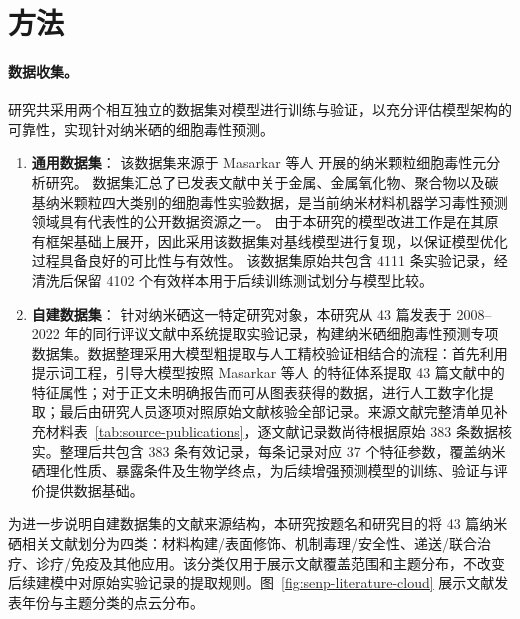\section{方法}

\paragraph{数据收集。}
研究共采用两个相互独立的数据集对模型进行训练与验证，以充分评估模型架构的可靠性，实现针对纳米硒的细胞毒性预测。

\begin{enumerate}
  \item \textbf{通用数据集}：
该数据集来源于 Masarkar 等人 \cite{masarkar2024} 开展的纳米颗粒细胞毒性元分析研究。
数据集汇总了已发表文献中关于金属、金属氧化物、聚合物以及碳基纳米颗粒四大类别的细胞毒性实验数据，是当前纳米材料机器学习毒性预测领域具有代表性的公开数据资源之一。
由于本研究的模型改进工作是在其原有框架基础上展开，因此采用该数据集对基线模型进行复现，以保证模型优化过程具备良好的可比性与有效性。
该数据集原始共包含 4111 条实验记录，经清洗后保留 4102 个有效样本用于后续训练测试划分与模型比较。

  \item \textbf{自建数据集}：
针对纳米硒这一特定研究对象，本研究从 43 篇发表于 2008--2022 年的同行评议文献中系统提取实验记录，构建纳米硒细胞毒性预测专项数据集。数据整理采用大模型粗提取与人工精校验证相结合的流程：首先利用提示词工程，引导大模型按照 Masarkar 等人\cite{masarkar2024} 的特征体系提取 43 篇文献中的特征属性；对于正文未明确报告而可从图表获得的数据，进行人工数字化提取；最后由研究人员逐项对照原始文献核验全部记录。来源文献完整清单见补充材料表~\ref{tab:source-publications}，逐文献记录数尚待根据原始 383 条数据核实。整理后共包含 383 条有效记录，每条记录对应 37 个特征参数，覆盖纳米硒理化性质、暴露条件及生物学终点，为后续增强预测模型的训练、验证与评价提供数据基础。
\end{enumerate}

为进一步说明自建数据集的文献来源结构，本研究按题名和研究目的将 43 篇纳米硒相关文献划分为四类：材料构建/表面修饰、机制毒理/安全性、递送/联合治疗、诊疗/免疫及其他应用。该分类仅用于展示文献覆盖范围和主题分布，不改变后续建模中对原始实验记录的提取规则。图~\ref{fig:senp-literature-cloud} 展示文献发表年份与主题分类的点云分布。

